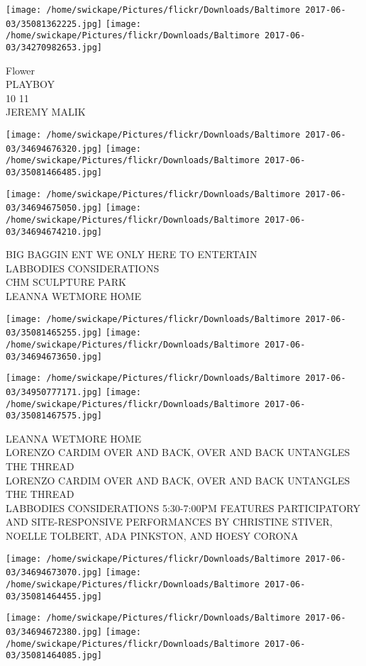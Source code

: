 \documentclass[10pt,letterpaper]{article}
\begin{document}
\texttt{[image: /home/swickape/Pictures/flickr/Downloads/Baltimore 2017-06-03/35081362225.jpg]}
\texttt{[image: /home/swickape/Pictures/flickr/Downloads/Baltimore 2017-06-03/34270982653.jpg]}

Flower\\
PLAYBOY\\
10 11\\
JEREMY MALIK
\pagebreak

\texttt{[image: /home/swickape/Pictures/flickr/Downloads/Baltimore 2017-06-03/34694676320.jpg]}
\texttt{[image: /home/swickape/Pictures/flickr/Downloads/Baltimore 2017-06-03/35081466485.jpg]}

\texttt{[image: /home/swickape/Pictures/flickr/Downloads/Baltimore 2017-06-03/34694675050.jpg]}
\texttt{[image: /home/swickape/Pictures/flickr/Downloads/Baltimore 2017-06-03/34694674210.jpg]}

BIG BAGGIN ENT WE ONLY HERE TO ENTERTAIN\\
LABBODIES CONSIDERATIONS\\
CHM SCULPTURE PARK\\
LEANNA WETMORE HOME
\pagebreak

\texttt{[image: /home/swickape/Pictures/flickr/Downloads/Baltimore 2017-06-03/35081465255.jpg]}
\texttt{[image: /home/swickape/Pictures/flickr/Downloads/Baltimore 2017-06-03/34694673650.jpg]}

\texttt{[image: /home/swickape/Pictures/flickr/Downloads/Baltimore 2017-06-03/34950777171.jpg]}
\texttt{[image: /home/swickape/Pictures/flickr/Downloads/Baltimore 2017-06-03/35081467575.jpg]}

LEANNA WETMORE HOME\\
LORENZO CARDIM OVER AND BACK, OVER AND BACK UNTANGLES THE THREAD\\
LORENZO CARDIM OVER AND BACK, OVER AND BACK UNTANGLES THE THREAD\\
LABBODIES CONSIDERATIONS 5:30{-}7:00PM FEATURES PARTICIPATORY AND SITE{-}RESPONSIVE PERFORMANCES BY CHRISTINE STIVER, NOELLE TOLBERT, ADA PINKSTON, AND HOESY CORONA
\pagebreak

\texttt{[image: /home/swickape/Pictures/flickr/Downloads/Baltimore 2017-06-03/34694673070.jpg]}
\texttt{[image: /home/swickape/Pictures/flickr/Downloads/Baltimore 2017-06-03/35081464455.jpg]}

\texttt{[image: /home/swickape/Pictures/flickr/Downloads/Baltimore 2017-06-03/34694672380.jpg]}
\texttt{[image: /home/swickape/Pictures/flickr/Downloads/Baltimore 2017-06-03/35081464085.jpg]}
\end{document}
